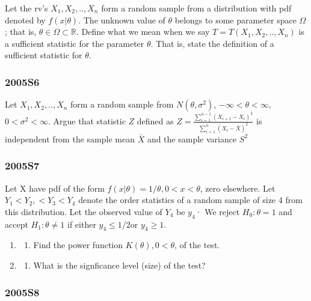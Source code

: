 \documentclass[10pt,twocolumn,portrait]{article}
\providecommand{\tightlist}{%
  \setlength{\itemsep}{0pt}\setlength{\parskip}{0pt}}
\begin{document}
Let the rv's \(X_1,X_2,..,X_n\) form a random sample from a distribution
with pdf denoted by \(f(x|\theta)\). The unknown value of \(\theta\)
belongs to some parameter space \(\Omega\); that is,
\(\theta\in\Omega\subset\mathbb R\). Define what we mean when we say
\(T=T(X_1,X_2,..,X_n)\) is a sufficient statistic for the parameter
\(\theta\). That is, state the definition of a sufficient statistic for
\(\theta\).

\hypertarget{s6-1}{%
\subsubsection{2005S6}\label{s6-1}}

Let \(X_1,X_2,..,X_n\) form a random sample from \(N(\theta,\sigma^2)\),
\(-\infty<\theta<\infty\),\(0<\sigma^2<\infty\). Argue that statistic
\(Z\) defined as
\(Z=\frac{\sum_{i=1}^{n-1}(X_{i+1}-X_{i})^2}{\sum_{i=1}^{n}(X_{i}-\bar X)^2}\)
is independent from the sample mean \(\bar X\) and the sample variance
\(S^2\)

\hypertarget{s7-1}{%
\subsubsection{2005S7}\label{s7-1}}

Let X have pdf of the form \(f(x|\theta)=1/\theta, 0<x<\theta\), zero
elsewhere. Let \(Y_1<Y_2,<Y_3<Y_4\) denote the order statistics of a
random sample of size 4 from this distribution. Let the observed value
of \(Y_4\) be \(y_4\)· We reject \(H_0:\theta=1\) and accept
\(H_1:\theta\neq1\) if either \(y_4\le1/2\)or \(y_4\ge1\).

\begin{enumerate}
\def\labelenumi{(\alph{enumi})}
\item
  \begin{enumerate}
  \def\labelenumii{(\arabic{enumii})}
  \setcounter{enumii}{5}
  \tightlist
  \item
    Find the power function \(K(\theta), 0<\theta\), of the test.
  \end{enumerate}
\item
  \begin{enumerate}
  \def\labelenumii{(\arabic{enumii})}
  \setcounter{enumii}{3}
  \tightlist
  \item
    What is the signficance level (size) of the test?
  \end{enumerate}
\end{enumerate}

\hypertarget{s8-1}{%
\subsubsection{2005S8}\label{s8-1}}
\end{document}
